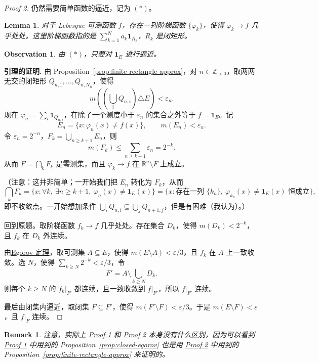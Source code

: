 \documentclass[12pt,letterpaper,twoside,openright]{ctexbook}
\theoremstyle{bluehead}
\newtheorem{lemma}[theorem]{Lemma}
\theoremstyle{olivehead}
\theoremstyle{orangehead}
\theoremstyle{redremark}
\newtheorem*{remark}{Remark}
\newtheorem*{observation}{Observation}
\begin{document}
\begin{proof}[Proof 2]\label{proof:lusin-two}
仍然需要简单函数的逼近，记为 $(*)$。

\begin{lemma}
对于 Lebesgue 可测函数 $f$，存在一列阶梯函数 $\{\varphi_k\}$，使得 $\varphi_k\to f$ 几乎处处。这里阶梯函数指的是 $\sum_{k=1}^N a_k\mathbf1_{R_k}$，$R_k$ 是闭矩形。
\end{lemma}

\begin{observation}
由 $(*)$，只要对 $\mathbf1_E$ 进行逼近。
\end{observation}

\textbf{引理的证明.} 由 Proposition~\ref{prop:finite-rectangle-approx}，对 $n\in\mathbb Z_{>0}$，取两两无交的闭矩形 $Q_{n,1},\ldots,Q_{n,N_n}$，使得
\[
m\!\left(\left(\bigcup_iQ_{n,i}\right)\triangle E\right)<\varepsilon_n.
\]
现在 $\varphi_n=\sum_i\mathbf1_{Q_{n,i}}$，在除了一个测度小于 $\varepsilon_n$ 的集合之外等于 $f=\mathbf1_E$。记
\[
E_n=\{x:\varphi_n(x)\ne f(x)\},\qquad m(E_n)<\varepsilon_n.
\]
令 $\varepsilon_n=2^{-n}$，$F_k=\bigcup_{n\geq k+1}E_n$，则
\[
m(F_k)\leq\sum_{n\geq k+1}\varepsilon_n=2^{-k}.
\]
从而 $F=\bigcap_kF_k$ 是零测集，而且 $\varphi_k\to f$ 在 $\mathbb R^n\setminus F$ 上成立。

（注意：这并非简单；一开始我们把 $E_n$ 转化为 $F_k$，从而
\[
\bigcap_kF_k
=\{x:\forall k,\ \exists n\geq k+1,\ \varphi_n(x)\ne\mathbf1_E(x)\}
=\{x:\text{存在一列 }\{k_n\},\ \varphi_{k_n}(x)\ne\mathbf1_E(x)\text{ 恒成立}\},
\]
即不收敛点。一开始想加条件 $\bigcup_iQ_{n,i}\subseteq\bigcup_jQ_{n+1,j}$，但是有困难（我认为）。）

回到原题。取阶梯函数 $f_k\to f$ 几乎处处。存在集合 $D_k$，使得 $m(D_k)<2^{-k}$，且 $f_k$ 在 $D_k$ 外连续。

由\hyperref[thm:egorov-general]{Egorov 定理}，取可测集 $A\subseteq E$，使得 $m(E\setminus A)<\varepsilon/3$，且 $f_k$ 在 $A$ 上一致收敛。选 $N$，使得 $\sum_{k\geq N}2^{-k}<\varepsilon/3$，令
\[
F'=A\setminus\bigcup_{k\geq N}D_k.
\]
则每个 $k\geq N$ 的 $f_k|_{F'}$ 都连续，且一致收敛到 $f|_{F'}$，所以 $f|_{F'}$ 连续。

最后由闭集内逼近，取闭集 $F\subseteq F'$，使得 $m(F'\setminus F)<\varepsilon/3$。于是 $m(E\setminus F)<\varepsilon$，且 $f|_F$ 连续。
\end{proof}
\begin{remark}
注意，实际上 \hyperref[proof:lusin-one]{Proof 1} 和 \hyperref[proof:lusin-two]{Proof 2} 本身没有什么区别，因为可以看到 \hyperref[proof:lusin-one]{Proof 1} 中用到的 Proposition~\ref{prop:closed-egorov} 也是用 \hyperref[proof:lusin-two]{Proof 2} 中用到的 Proposition~\ref{prop:finite-rectangle-approx} 来证明的。
\end{remark}
\end{document}
